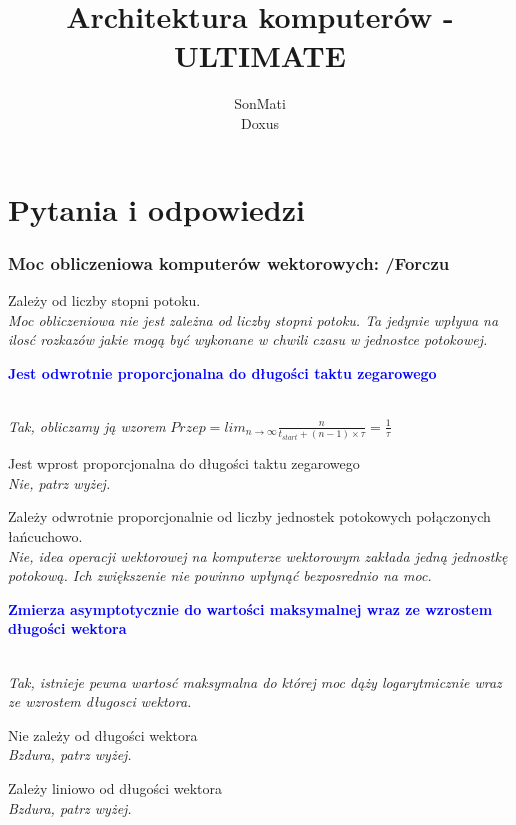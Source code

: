 \documentclass[a4paper,twoside]{article}
\begin{document}




\begin{titlepage}
\title{\huge Architektura komputerów - ULTIMATE}
\author{\large SonMati \\ Doxus}
\maketitle
\end{titlepage}

\part*{Pytania i odpowiedzi}
\section{Moc obliczeniowa komputerów wektorowych: {\small /Forczu}}
	\begin{itemize}
    \item Zależy od liczby stopni potoku.\\
    {\small \emph{Moc obliczeniowa nie jest zależna od liczby stopni potoku. Ta jedynie wpływa na ilosć rozkazów jakie mogą być wykonane w chwili czasu w jednostce potokowej.}}
    \textcolor{Blue}{\item \textbf{Jest odwrotnie proporcjonalna do długości taktu zegarowego}}\\
    {\small \emph{Tak, obliczamy ją wzorem} $Przep=lim_{n \to \infty}\frac{n}{t_{start}+(n-1)\times\tau}=\frac{1}{\tau}$}
    \item Jest wprost proporcjonalna do długości taktu zegarowego\\
    {\small \emph{Nie, patrz wyżej.}}
    \item Zależy odwrotnie proporcjonalnie od liczby jednostek potokowych połączonych łańcuchowo.\\
    {\small \emph{Nie, idea operacji wektorowej na komputerze wektorowym zakłada jedną jednostkę potokową. Ich zwiększenie nie powinno wpłynąć bezposrednio na moc.}}
    \textcolor{Blue}{\item \textbf{Zmierza asymptotycznie do wartości maksymalnej wraz ze wzrostem długości wektora}}\\
    {\small \emph{Tak, istnieje pewna wartosć maksymalna do której moc dąży logarytmicznie wraz ze wzrostem długosci wektora.}}
    \item Nie zależy od długości wektora\\
    {\small \emph{Bzdura, patrz wyżej.}}
    \item Zależy liniowo od długości wektora\\
    {\small \emph{Bzdura, patrz wyżej.}}
    \end{itemize}
\end{document}
